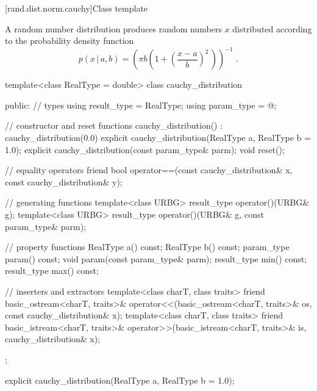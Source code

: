
[rand.dist.norm.cauchy]{Class template }%
%

\pnum
A  random number distribution
produces random numbers $x$
distributed according to
the probability density function%
\[  p(x\,|\,a,b) = \left(\pi b \left(1 + \left(\frac{x-a}{b} \right)^2 \, \right)\right)^{-1} \text{ .} \]

%
%
\begin{codeblock}
template<class RealType = double>
  class cauchy_distribution {
  public:
    // types
    using result_type = RealType;
    using param_type  = @\unspec@;

    // constructor and reset functions
    cauchy_distribution() : cauchy_distribution(0.0) {}
    explicit cauchy_distribution(RealType a, RealType b = 1.0);
    explicit cauchy_distribution(const param_type& parm);
    void reset();

    // equality operators
    friend bool operator==(const cauchy_distribution& x, const cauchy_distribution& y);

    // generating functions
    template<class URBG>
      result_type operator()(URBG& g);
    template<class URBG>
      result_type operator()(URBG& g, const param_type& parm);

    // property functions
    RealType a() const;
    RealType b() const;
    param_type param() const;
    void param(const param_type& parm);
    result_type min() const;
    result_type max() const;

    // inserters and extractors
    template<class charT, class traits>
      friend basic_ostream<charT, traits>&
        operator<<(basic_ostream<charT, traits>& os, const cauchy_distribution& x);
    template<class charT, class traits>
      friend basic_istream<charT, traits>&
        operator>>(basic_istream<charT, traits>& is, cauchy_distribution& x);
  };
\end{codeblock}


%
\begin{itemdecl}
explicit cauchy_distribution(RealType a, RealType b = 1.0);
\end{itemdecl}

